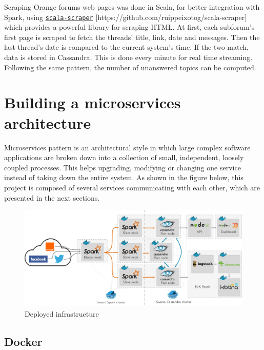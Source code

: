 \documentclass[11pt]{article}
\begin{document}
Scraping \textsf{Orange} forums web pages was done in \textsf{Scala}, for better integration with \textsf{Spark}, using \href{https://github.com/ruippeixotog/scala-scraper}{\texttt{scala-scraper}} [https://github.com/ruippeixotog/scala-scraper] which provides a powerful library for scraping \textsf{HTML}. At first, each subforum's first page is scraped to fetch the threads' title, link, date and messages. Then the last thread's date is compared to the current system's time. If the two match, data is stored in \textsf{Cassandra}. This is done every minute for real time streaming. Following the same pattern, the number of unanswered topics can be computed. 

\section{Building a microservices architecture}


Microservices pattern is an architectural style in which large complex software applications are broken down into a collection of small, independent, loosely coupled processes. This helps upgrading, modifying or changing one service instead of taking down the entire system. As shown in the figure below, this project is composed of several services communicating with each other, which are presented in the next sections.

\begin{figure}[h!]
    \centering
    \includegraphics[scale=0.15]{img/archi.png}
    \caption{Deployed infrastructure}
    \label{infra}
\end{figure}

\subsection{Docker}
\end{document}
